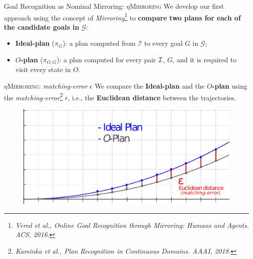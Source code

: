 \documentclass[usenames,dvipsnames]{beamer}
\begin{document}
    \begin{frame}{Goal Recognition as Nominal Mirroring: $\eta$\textsc{Mirroring}}
			We develop our first approach using the concept of \emph{Mirroring}\footnote{\tiny \it Vered et al., Online Goal Recognition through Mirroring: Humans and Agents. ACS, 2016.} to \textbf{compare two plans for each of the candidate goals in} $\mathcal{G}$:
			\vspace{2mm}
	       	\begin{itemize}
				\vspace{2mm}
	       		\item \textbf{Ideal-plan} ($\pi_G$): a plan computed from $\mathcal{I}$ to every goal $G$ in $\mathcal{G}$;
				\vspace{2mm}
				\item \textbf{$O$-plan} ($\pi_{O,G}$): a plan computed for every pair ${\cal I}$, $G$, and it is required to visit every state in $O$. 
			\end{itemize}
    \end{frame}
	
    \begin{frame}{$\eta$\textsc{Mirroring}: \emph{matching-error} {\huge $\epsilon$}}
		We compare the \textbf{Ideal-plan} and the \textbf{$O$-plan} using the \emph{matching-error}\footnote{\tiny \it Kaminka et al., Plan Recognition in Continuous Domains. AAAI, 2018.} {\huge $\epsilon$}, i.e., the \textbf{Euclidean distance} between the trajectories.

		\begin{figure}[]
		 	\centering
		 	\includegraphics[width=0.85\linewidth]{fig/nominal_mirroring.pdf}
			\vspace{-2mm}
		\end{figure}
    \end{frame}
\end{document}
